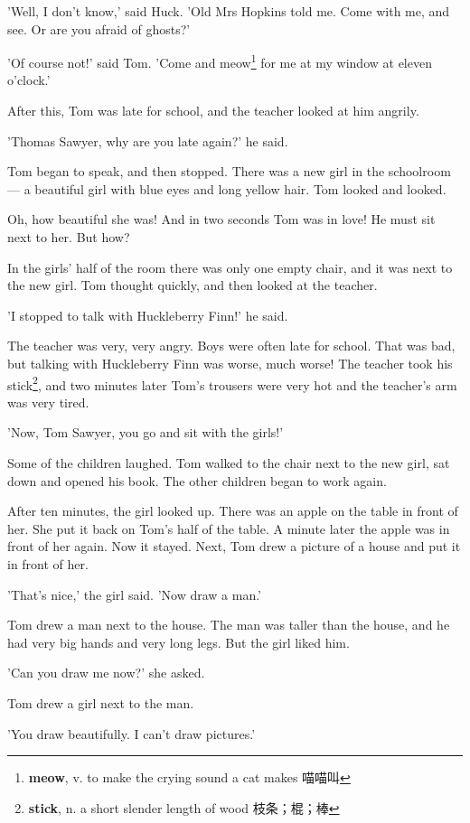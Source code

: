 \documentclass[fontset=ubuntu, zihao=5]{ctexart}
\begin{document}
\begin{paracol}{2}
'Well, I don't know,' said Huck. 'Old Mrs Hopkins told me. Come with me, and see. Or are you afraid of ghosts?'

'Of course not!' said Tom. 'Come and meow\footnote{\textbf{meow}, v. to make the crying sound a cat makes 喵喵叫} for me at my window at eleven o'clock.'

After this, Tom was late for school, and the teacher looked at him angrily.

'Thomas Sawyer, why are you late again?' he said.

Tom began to speak, and then stopped. There was a new girl in the schoolroom — a beautiful girl with blue eyes and long yellow hair. Tom looked and looked.

Oh, how beautiful she was! And in two seconds Tom was in love! He must sit next to her. But how?



In the girls' half of the room there was only one empty chair, and it was next to the new girl. Tom thought quickly, and then looked at the teacher.

'I stopped to talk with Huckleberry Finn!' he said.

The teacher was very, very angry. Boys were often late for school. That was bad, but talking with Huckleberry Finn was worse, much worse! The teacher took his stick\footnote{\textbf{stick}, n. a short slender length of wood 枝条；棍；棒}, and two minutes later Tom's trousers were very hot and the teacher's arm was very tired.

'Now, Tom Sawyer, you go and sit with the girls!'

Some of the children laughed. Tom walked to the chair next to the new girl, sat down and opened his book. The other children began to work again.

After ten minutes, the girl looked up. There was an apple on the table in front of her. She put it back on Tom's half of the table. A minute later the apple was in front of her again. Now it stayed. Next, Tom drew a picture of a house and put it in front of her.

'That's nice,' the girl said. 'Now draw a man.'

Tom drew a man next to the house. The man was taller than the house, and he had very big hands and very long legs. But the girl liked him.

'Can you draw me now?' she asked.

Tom drew a girl next to the man.

'You draw beautifully. I can't draw pictures.'


\end{paracol}
\end{document}
